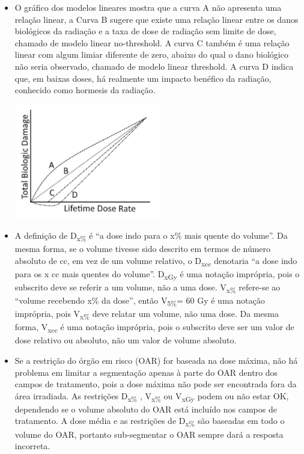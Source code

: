 \documentclass[11pt,a4paper]{article}
\newcounter{exemplo}
\begin{document}
\begin{exemplo}[Medicina]

    \begin{itemize}

        \item   O gráfico dos modelos lineares mostra que a curva A não apresenta uma relação linear, a Curva B sugere que existe uma relação linear entre os danos biológicos da radiação e a taxa de dose de radiação sem limite de dose, chamado de modelo linear no-threshold. A curva C também é uma relação linear com algum limiar diferente de zero, abaixo do qual o dano biológico não seria observado, chamado de modelo linear threshold. A curva D indica que, em baixas doses, há realmente um impacto benéfico da radiação, conhecido como hormesis da radiação.
        
        \begin{center}
            \includegraphics[width=0.5\textwidth]{Imagens/modelosLineares.jpg}
        \end{center}
        
        \item A definição de D\textsubscript{x\%} é “a dose indo para o x\% mais quente do volume”. Da mesma forma, se o volume tivesse sido descrito em termos de número absoluto de cc, em vez de um volume relativo, o D\textsubscript{xcc} denotaria “a dose indo para os x cc mais quentes do volume”. D\textsubscript{xGy} é uma notação imprópria, pois o subscrito deve se referir a um volume, não a uma dose. V\textsubscript{x\%} refere-se ao “volume recebendo x\% da dose”, então V\textsubscript{5\%}= 60 Gy é uma notação imprópria, pois V\textsubscript{x\%} deve relatar um volume, não uma dose. Da mesma forma, V\textsubscript{xcc} é uma notação imprópria, pois o subscrito deve ser um valor de dose relativo ou absoluto, não um valor de volume absoluto.
        
        \item Se a restrição do órgão em risco (OAR) for baseada na dose máxima, não há problema em limitar a segmentação apenas à parte do OAR dentro dos campos de tratamento, pois a dose máxima não pode ser encontrada fora da área irradiada. As restrições D\textsubscript{x\%} , V\textsubscript{x\%} ou V\textsubscript{xGy} podem ou não estar OK, dependendo se o volume absoluto do OAR está incluído nos campos de tratamento. A dose média e as restrições de D\textsubscript{x\%} são baseadas em todo o volume do OAR, portanto sub-segmentar o OAR sempre dará a resposta incorreta.
        

\end{itemize}
\end{exemplo}
\end{document}
